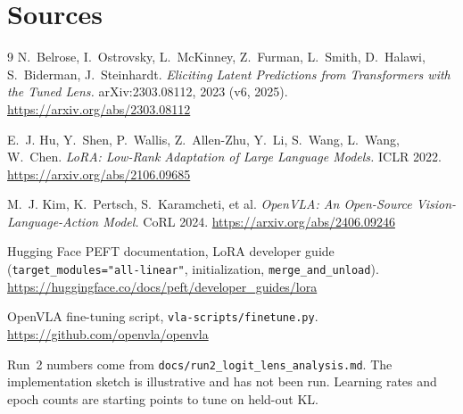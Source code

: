\documentclass[11pt]{article}
\begin{document}
\section{Sources}

\begin{thebibliography}{9}
 N.~Belrose, I.~Ostrovsky, L.~McKinney, Z.~Furman, L.~Smith, D.~Halawi, S.~Biderman, J.~Steinhardt.
\emph{Eliciting Latent Predictions from Transformers with the Tuned Lens.} arXiv:2303.08112, 2023 (v6, 2025). \url{https://arxiv.org/abs/2303.08112}

 E.~J. Hu, Y.~Shen, P.~Wallis, Z.~Allen-Zhu, Y.~Li, S.~Wang, L.~Wang, W.~Chen.
\emph{LoRA: Low-Rank Adaptation of Large Language Models.} ICLR 2022. \url{https://arxiv.org/abs/2106.09685}

 M.~J. Kim, K.~Pertsch, S.~Karamcheti, et al.
\emph{OpenVLA: An Open-Source Vision-Language-Action Model.} CoRL 2024. \url{https://arxiv.org/abs/2406.09246}

 Hugging Face PEFT documentation, LoRA developer guide (\texttt{target\_modules="all-linear"}, initialization, \texttt{merge\_and\_unload}). \url{https://huggingface.co/docs/peft/developer_guides/lora}

 OpenVLA fine-tuning script, \texttt{vla-scripts/finetune.py}. \url{https://github.com/openvla/openvla}
\end{thebibliography}

\noindent\small Run~2 numbers come from \texttt{docs/run2\_logit\_lens\_analysis.md}. The implementation sketch is illustrative and has not been run. Learning rates and epoch counts are starting points to tune on held-out KL.
\end{document}
